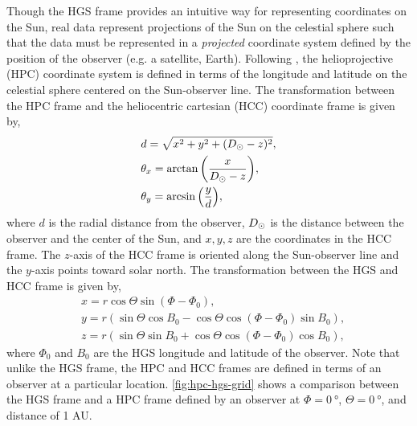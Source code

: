 Though the HGS frame provides an intuitive way for representing coordinates on the Sun, real data represent projections of the Sun on the celestial sphere such that the data must be represented in a \textit{projected} coordinate system defined by the position of the observer (e.g. a satellite, Earth). Following \citet{thompson_coordinate_2006}, the helioprojective (HPC) coordinate system is defined in terms of the longitude and latitude on the celestial sphere centered on the Sun-observer line. The transformation between the HPC frame and the heliocentric cartesian (HCC) coordinate frame is given by,
\begin{align}\label{eq:hcc_hpc_transform}
    &d = \sqrt{x^2 + y^2  + (D_{\odot} - z)^2}, \\
    &\theta_x = \arctan{\left(\frac{x}{D_{\odot} - z}\right)}, \\
    &\theta_y = \arcsin{\left(\frac{y}{d}\right)},
\end{align}
where $d$ is the radial distance from the observer, $D_{\odot}$ is the distance between the observer and the center of the Sun, and $x,y,z$ are the coordinates in the HCC frame. The $z$-axis of the HCC frame is oriented along the Sun-observer line and the $y$-axis points toward solar north. The transformation between the HGS and HCC frame is given by,
\begin{align}\label{eq:hgs_hcc_transform}
    &x = r\cos{\Theta}\sin{(\Phi - \Phi_0)}, \\
    &y = r\left( \sin{\Theta}\cos{B_0} - \cos{\Theta}\cos{(\Phi - \Phi_0)}\sin{B_0} \right), \\
    &z = r\left( \sin{\Theta}\sin{B_0} + \cos{\Theta}\cos{(\Phi - \Phi_0)}\cos{B_0} \right),
\end{align}
where $\Phi_0$ and $B_0$ are the HGS longitude and latitude of the observer. Note that unlike the HGS frame, the HPC and HCC frames are defined in terms of an observer at a particular location. \autoref{fig:hpc-hgs-grid} shows a comparison between the HGS frame and a HPC frame defined by an observer at $\Phi=\SI{0}{\degree}$, $\Theta=\SI{0}{\degree}$, and distance of \num{1} AU. 

